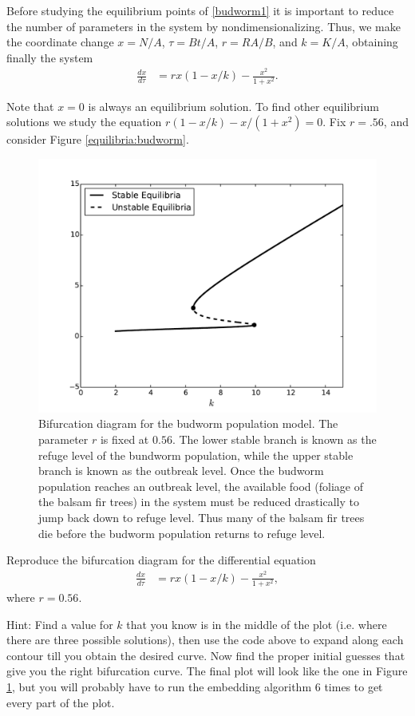 Before studying the equilibrium points of \eqref{budworm1} it is important to reduce the number of parameters in the system by nondimensionalizing.
Thus, we make the coordinate change $x = N/A$, $\tau = Bt/A$, $r = RA/B$, and $k = K/A$, obtaining finally the system 
\begin{align}
	\frac{dx}{d \tau} &= rx(1-x/k) - \frac{x^2}{1+x^2}.
\end{align}

Note that $x = 0$ is always an equilibrium solution.
To find other equilibrium solutions we study the equation $r(1-x/k)-x/(1+x^2) = 0$.
Fix $r = .56$, and consider Figure \eqref{equilibria:budworm}. 

\begin{figure}
\centering
\includegraphics[width=\textwidth]{BudwormPopulation.pdf}
\caption{Bifurcation diagram for the budworm population model.
The parameter $r$ is fixed at $0.56.$
The lower stable branch is known as the refuge level of the bundworm population, while the upper stable branch is known as the outbreak level.
Once the budworm population reaches an outbreak level, the available food (foliage of the balsam fir trees) in the system must be reduced drastically to jump back down to refuge level.
Thus many of the balsam fir trees die before the budworm population returns to refuge level.}
\label{bifurcation:budworm}
\end{figure}

\begin{problem}
Reproduce the bifurcation diagram for the differential equation
\begin{align*}
	\frac{dx}{d \tau} &= rx(1-x/k) - \frac{x^2}{1+x^2},
\end{align*}
where $r = 0.56$.

Hint: Find a value for $k$ that you know is in the middle of the plot (i.e. where there are three possible solutions), then use the code above to expand along each contour till you obtain the desired curve.
Now find the proper initial guesses that give you the right bifurcation curve.
The final plot will look like the one in Figure \ref{bifurcation:budworm}, but you will probably have to run the embedding algorithm 6 times to get every part of the plot.
\end{problem}